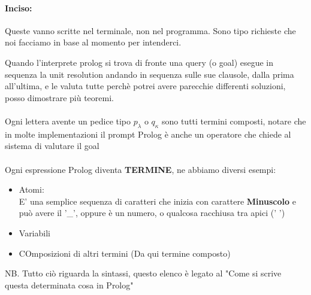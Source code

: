 \documentclass[12pt, a4paper, openany, oneside]{book}
\begin{document}
{\begin{itemize}
	\paragraph{Inciso: }Queste vanno scritte nel terminale, non nel programma.
	Sono tipo richieste che noi facciamo in base al momento per intenderci. 
\end{itemize}
Quando l'interprete prolog si trova di fronte una query (o goal) esegue in 
sequenza la unit resolution andando in sequenza sulle sue clausole, dalla prima
all'ultima, e le valuta tutte perchè potrei avere parecchie differenti soluzioni, 
posso dimostrare più teoremi.
\\ \\
Ogni lettera avente un pedice tipo $p_{\lambda}$ o $q_{\kappa}$ sono tutti 
termini composti, notare che in molte implementazioni il prompt Prolog è anche 
un operatore che chiede al sistema di valutare il \color{blue} goal \color{black}
\\ \\
Ogni espressione Prolog diventa \textbf{TERMINE}, ne abbiamo diversi esempi:
\begin{itemize}
	\item Atomi: \\
	E' una semplice sequenza di caratteri che inizia con carattere \textbf{Minuscolo}
	e può avere il '\_', oppure è un numero, o qualcosa racchiusa tra apici (' ') 
	\item Variabili
	\item COmposizioni di altri termini (Da qui termine composto)
\end{itemize}
NB. Tutto ciò riguarda la sintassi, questo elenco è legato al "Come si scrive 
questa determinata cosa in Prolog" 
}
\end{document}
